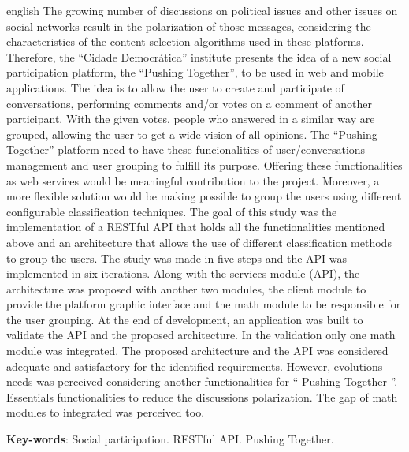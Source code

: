 \begin{resumo}[Abstract]
 \begin{otherlanguage*}{english}
  The growing number of discussions on political issues and other issues on social networks
  result in the polarization of those messages, considering the characteristics
  of the content selection algorithms used in these platforms. Therefore,
  the ``Cidade Democrática'' institute presents the idea of a new social participation
  platform, the ``Pushing Together'', to be used in web and mobile applications.
  The idea is to allow the user to create and participate of conversations, performing
  comments and/or votes on a comment of another participant. With the given votes, people
  who answered in a similar way are grouped, allowing the user to get a wide
  vision of all opinions.
  The ``Pushing Together'' platform need to have these funcionalities of 
  user/conversations management and user grouping to fulfill its purpose. 
  Offering these functionalities as web services would be meaningful 
  contribution to the project. Moreover, a more flexible solution 
  would be making possible to group the users using different configurable 
  classification techniques.
  The goal of this study was the implementation of a RESTful API that 
  holds all the functionalities mentioned above and an architecture
  that allows the use of different classification methods to group the users.
  The study was made in five steps and the API was implemented in six iterations.
  Along with the services module (API), the architecture was proposed with another two modules,
  the client module to provide the platform graphic interface and the math module to be responsible for the user grouping.
  At the end of development, an application was built to validate the API and the proposed architecture. In the validation only one math module
  was integrated. The proposed architecture and the API was considered adequate and satisfactory for the identified requirements. However, evolutions needs was
  perceived considering another functionalities for `` Pushing Together ''.
   Essentials functionalities to reduce the discussions polarization. The gap
of math modules to integrated was perceived too.
  

   \vspace{\onelineskip}

   \noindent
   \textbf{Key-words}: Social participation. RESTful API. Pushing Together.
 \end{otherlanguage*}
\end{resumo}
